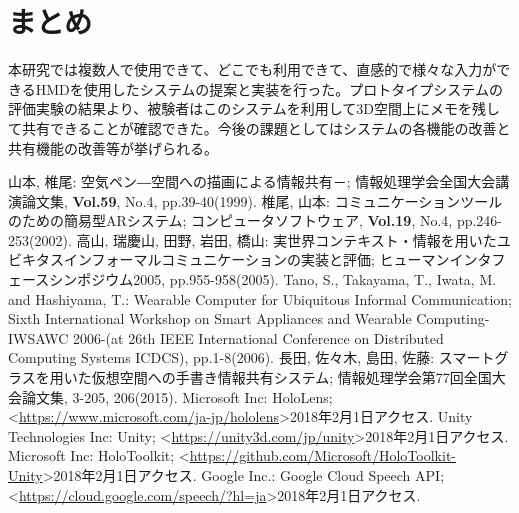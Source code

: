 \documentclass[twocolumn, a4paper]{UECIEresume}
\begin{document}
\section{まとめ}
本研究では複数人で使用できて、どこでも利用できて、直感的で様々な入力ができるHMDを使用したシステムの提案と実装を行った。プロトタイプシステムの評価実験の結果より、被験者はこのシステムを利用して3D空間上にメモを残して共有できることが確認できた。今後の課題としてはシステムの各機能の改善と共有機能の改善等が挙げられる。

\vspace{-1zh}

{\small
\begin{thebibliography}{99}
        山本, 椎尾:
        空気ペン―空間への描画による情報共有－;
        情報処理学会全国大会講演論文集,
        {\bf Vol.59}, No.4, pp.39-40(1999).
	椎尾, 山本:
	コミュニケーションツールのための簡易型ARシステム;
	コンピュータソフトウェア, 
        {\bf Vol.19}, No.4, pp.246-253(2002).
	高山, 瑞慶山, 田野, 岩田, 橋山:
	実世界コンテキスト・情報を用いたユビキタスインフォーマルコミュニケーションの実装と評価;
	ヒューマンインタフェースシンポジウム2005,
        pp.955-958(2005).
        Tano, S., Takayama, T., Iwata, M. and Hashiyama, T.:
        Wearable Computer for Ubiquitous Informal Communication;
        Sixth International Workshop on Smart Appliances and Wearable Computing-IWSAWC 2006-(at 26th IEEE International Conference on Distributed Computing Systems ICDCS),
        pp.1-8(2006).
        長田, 佐々木, 島田, 佐藤:
        スマートグラスを用いた仮想空間への手書き情報共有システム;
        情報処理学会第77回全国大会論文集,
        3-205, 206(2015).
        Microsoft Inc:
        HoloLens;
        \textless\url{https://www.microsoft.com/ja-jp/hololens}\textgreater2018年2月1日アクセス.
        Unity Technologies Inc:
        Unity;
        \textless\url{https://unity3d.com/jp/unity}\textgreater2018年2月1日アクセス.
        Microsoft Inc:
        HoloToolkit;
        \textless\url{https://github.com/Microsoft/HoloToolkit-Unity}\textgreater2018年2月1日アクセス.
	Google Inc.:
	Google Cloud Speech API;
	\textless\url{https://cloud.google.com/speech/?hl=ja}\textgreater2018年2月1日アクセス.
\end{thebibliography}
}
\end{document}
